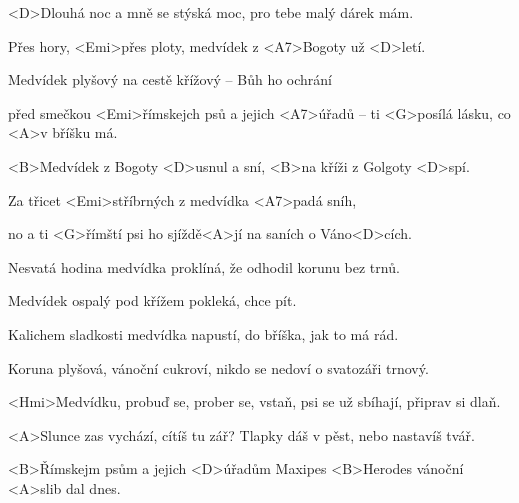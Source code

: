

\zs
<D>Dlouhá noc a mně se stýská moc,
pro tebe malý dárek mám.

Přes hory, <Emi>přes ploty,
medvídek z <A7>Bogoty už <D>letí.

Medvídek plyšový na cestě
křížový -- Bůh ho ochrání

před smečkou <Emi>římskejch psů
a jejich <A7>úřadů --
ti <G>posílá lásku, co <A>v bříšku má.
\ks


\zr
<B>Medvídek z Bogoty <D>usnul a sní,
<B>na kříži z Golgoty <D>spí.

Za třicet <Emi>stříbrných
z medvídka <A7>padá sníh,

no a ti <G>římští psi
ho sjíždě<A>jí na saních o Váno<D>cích.
\kr

\zs
Nesvatá hodina medvídka proklíná,
že odhodil korunu bez trnů.

Medvídek ospalý pod křížem pokleká,
chce pít.

Kalichem sladkosti medvídka
napustí, do bříška, jak to má rád.

Koruna plyšová, vánoční cukroví,
nikdo se nedoví o svatozáři trnový.
\ks

\zr \kr

\zs
<Hmi>Medvídku, probuď se, prober se, vstaň,
psi se už sbíhají, připrav si dlaň.

<A>Slunce zas vychází, cítíš tu zář?
Tlapky dáš v pěst, nebo nastavíš tvář.

<B>Římskejm psům a jejich <D>úřadům
Maxipes <B>Herodes vánoční <A>slib dal dnes.
\ks

\zr \kr

\kp






